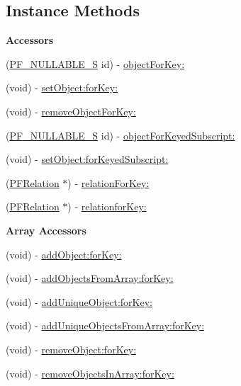 \subsection*{Instance Methods}
\begin{Indent}{\bf Accessors}\par
{\em 

 

 }\begin{DoxyCompactItemize}
\item 
(\hyperlink{_p_f_nullability_8h_ada31c80e56a25740ae808dccdacc9f1a}{P\+F\+\_\+\+N\+U\+L\+L\+A\+B\+L\+E\+\_\+\+S} id) -\/ \hyperlink{interface_p_f_object_a9ee439c1af34c1242087d5b1930214a9}{object\+For\+Key\+:}
\item 
(void) -\/ \hyperlink{interface_p_f_object_ac433d818cd62eb486ce1fa6fb1ad5015}{set\+Object\+:for\+Key\+:}
\item 
(void) -\/ \hyperlink{interface_p_f_object_afcbbe0e25d243c361281ff2521188fa7}{remove\+Object\+For\+Key\+:}
\item 
(\hyperlink{_p_f_nullability_8h_ada31c80e56a25740ae808dccdacc9f1a}{P\+F\+\_\+\+N\+U\+L\+L\+A\+B\+L\+E\+\_\+\+S} id) -\/ \hyperlink{interface_p_f_object_a4a0253ac900de704d559baeb2f9480ec}{object\+For\+Keyed\+Subscript\+:}
\item 
(void) -\/ \hyperlink{interface_p_f_object_a1c466b8ea8ee08f1f356c9089f9c1581}{set\+Object\+:for\+Keyed\+Subscript\+:}
\item 
(\hyperlink{interface_p_f_relation}{P\+F\+Relation} $\ast$) -\/ \hyperlink{interface_p_f_object_ab846711592e4d81c38a11147410eb028}{relation\+For\+Key\+:}
\item 
(\hyperlink{interface_p_f_relation}{P\+F\+Relation} $\ast$) -\/ \hyperlink{interface_p_f_object_a5fcd143c041166de62dce229299f6354}{relationfor\+Key\+:}
\end{DoxyCompactItemize}
\end{Indent}
\begin{Indent}{\bf Array Accessors}\par
{\em 

 

 }\begin{DoxyCompactItemize}
\item 
(void) -\/ \hyperlink{interface_p_f_object_a8b89e4344c41b638a82793e0ef79e60e}{add\+Object\+:for\+Key\+:}
\item 
(void) -\/ \hyperlink{interface_p_f_object_a3c4b12bd5f7531276e0614a586d7cb9d}{add\+Objects\+From\+Array\+:for\+Key\+:}
\item 
(void) -\/ \hyperlink{interface_p_f_object_a55b0fbe1266be7219ad2386fc2367ad7}{add\+Unique\+Object\+:for\+Key\+:}
\item 
(void) -\/ \hyperlink{interface_p_f_object_a5ad1fc29f29e007f8e21fb454c5ab6b1}{add\+Unique\+Objects\+From\+Array\+:for\+Key\+:}
\item 
(void) -\/ \hyperlink{interface_p_f_object_a03f864a19b0a6ba6b6a01f5898049e49}{remove\+Object\+:for\+Key\+:}
\item 
(void) -\/ \hyperlink{interface_p_f_object_adbcf2779180aac2f2953caa9fbf30f7c}{remove\+Objects\+In\+Array\+:for\+Key\+:}
\end{DoxyCompactItemize}
\end{Indent}
